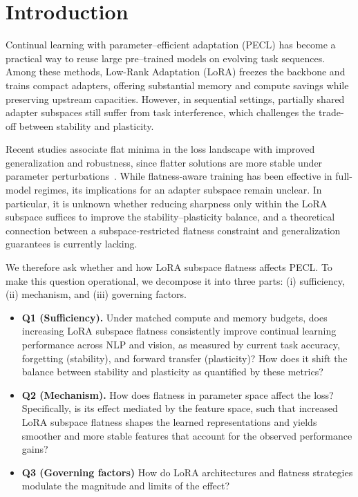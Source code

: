 \documentclass{article} %
\begin{document}
\section{Introduction}

Continual learning with parameter–efficient adaptation (PECL) has become a practical way to reuse large pre–trained models on evolving task sequences.  Among these methods, Low-Rank Adaptation (LoRA) freezes the backbone and trains compact adapters, offering substantial memory and compute savings while preserving upstream capacities. However, in sequential settings, partially shared adapter subspaces still suffer from task interference, which challenges the trade-off between stability and plasticity.


Recent studies associate flat minima in the loss landscape with improved generalization and robustness, since flatter solutions are more stable under parameter perturbations~\cite{wu2017understandinggeneralizationdeeplearning,chaudhariEntropySGDBiasingGradient2019,NEURIPS2020_518a38cc,NEURIPS2021_995f5e03,JMLRAnEmpiricalInvestigatio,yangRevisitingFlatnessAwareOptimization2025}. While flatness-aware training has been effective in full-model regimes, its implications for an adapter subspace remain unclear. In particular, it is unknown whether reducing sharpness only within the LoRA subspace suffices to improve the stability–plasticity balance, and a theoretical connection between a subspace-restricted flatness constraint and generalization guarantees is currently lacking.

We therefore ask whether and how LoRA subspace flatness affects PECL. To make this question operational, we decompose it into three parts: (i) sufficiency, (ii) mechanism, and (iii) governing factors.
\begin{itemize}
  \item \textbf{Q1 (Sufficiency).} Under matched compute and memory budgets, does increasing LoRA subspace flatness consistently improve continual learning performance across NLP and vision, as measured by current task accuracy, forgetting (stability), and forward transfer (plasticity)? How does it shift the balance between stability and plasticity as quantified by these metrics?
 \item \textbf{Q2 (Mechanism).} How does flatness in parameter space affect the loss? Specifically, is its effect mediated by the feature space, such that increased LoRA subspace flatness shapes the learned representations and yields smoother and more stable features that account for the observed performance gains?
\item \textbf{Q3 (Governing factors)} How do LoRA architectures and flatness strategies modulate the magnitude and limits of the effect?
\end{itemize}
\end{document}
